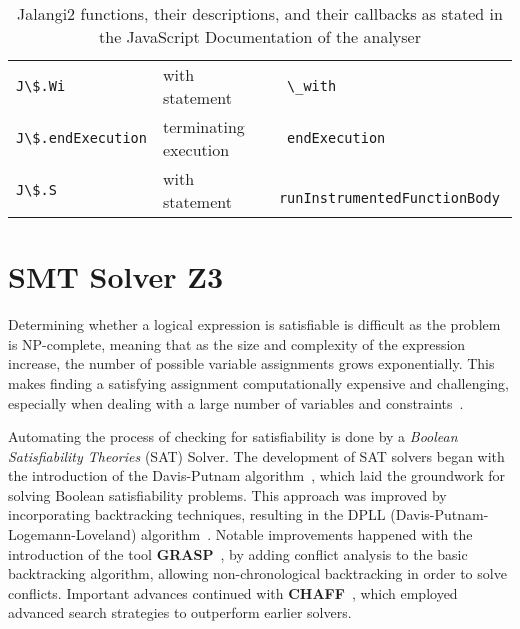 \begin{table}[t]
{\begin{tabular}{l|l|l}
		{\lstinline|J\$.Wi          |} & with statement                                        &\lstinline| \_with                      |            \\
		{\lstinline|J\$.endExecution|} & terminating execution                                 &\lstinline| endExecution                |            \\
		{\lstinline|J\$.S           |} & with statement                                        &\lstinline| runInstrumentedFunctionBody |            \\
	\end{tabular}}
	\caption[List of Jalangi2 functions]{Jalangi2  functions, their descriptions, and their callbacks as stated in the JavaScript Documentation of the analyser}
	\label{tab:jal-fun}
\end{table}

\section{SMT Solver Z3}
\label{sec:z3}

Determining whether a logical expression is satisfiable is difficult as the problem is NP-complete, meaning that as the size and complexity of the expression increase, the number of possible variable assignments grows exponentially. This makes finding a satisfying assignment computationally expensive and challenging, especially when dealing with a large number of variables and constraints~\cite{schaefer_complexity_1978}.

Automating the process of checking  for satisfiability is done by a \textit{Boolean Satisfiability Theories} (SAT) Solver. The development of SAT solvers began with the introduction of the Davis-Putnam algorithm~\citet{davis_computing_1960}, which laid the groundwork for solving Boolean satisfiability problems. This approach was improved by incorporating backtracking techniques, resulting in the DPLL (Davis-Putnam-Logemann-Loveland) algorithm~\citet{davis_machine_1962}. Notable improvements happened with the introduction of the tool \textbf{GRASP}~\cite{silva_grasp_1996}, by adding conflict analysis to the basic backtracking algorithm, allowing non-chronological backtracking in order to solve conflicts. Important advances continued with \textbf{CHAFF}~\citet{moskewicz_chaff_2001}, which employed advanced search strategies to outperform earlier solvers.



